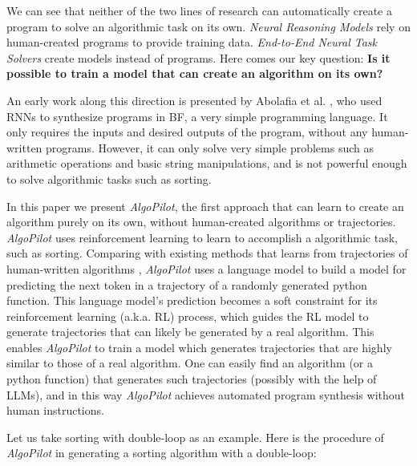 \documentclass[pdflatex,sn-mathphys-num]{sn-jnl}%
\theoremstyle{thmstyleone}%
\theoremstyle{thmstyletwo}%
\theoremstyle{thmstylethree}%
\begin{document}
We can see that neither of the two lines of research can automatically create a program to solve an algorithmic task on its own. \emph{Neural Reasoning Models} rely on human-created programs to provide training data. \emph{End-to-End Neural Task Solvers} create models instead of programs. Here comes our key question: \textbf{Is it possible to train a model that can create an algorithm on its own?}

An early work along this direction is presented by Abolafia et al. \cite{abolafia2018neural}, who used RNNs to synthesize programs in BF, a very simple programming language. It only requires the inputs and desired outputs of the program, without any human-written programs. However, it can only solve very simple problems such as arithmetic operations and basic string manipulations, and is not powerful enough to solve algorithmic tasks such as sorting. 

In this paper we present \emph{AlgoPilot}, the first approach that can learn to create an algorithm purely on its own, without human-created algorithms or trajectories. \emph{AlgoPilot} uses reinforcement learning to learn to accomplish a algorithmic task, such as sorting. Comparing with existing methods that learns from trajectories of human-written algorithms \cite{reed2015neural} \cite{velivckovic2021neural} \cite{zhang2022causal}, \emph{AlgoPilot} uses a language model to build a model for predicting the next token in a trajectory of a randomly generated python function. This language model's prediction becomes a soft constraint for its reinforcement learning (a.k.a. RL) process, which guides the RL model to generate trajectories that can likely be generated by a real algorithm. This enables \emph{AlgoPilot} to train a model which generates trajectories that are highly similar to those of a real algorithm. One can easily find an algorithm (or a python function) that generates such trajectories (possibly with the help of LLMs), and in this way \emph{AlgoPilot} achieves automated program synthesis without human instructions.

Let us take sorting with double-loop as an example. Here is the procedure of \emph{AlgoPilot} in generating a sorting algorithm with a double-loop:
\end{document}
